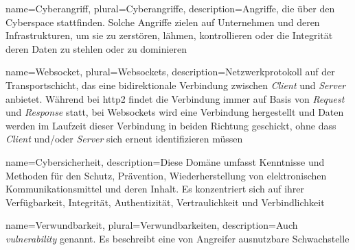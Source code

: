 


 {
    name={Cyberangriff},
    plural={Cyberangriffe},
    description={Angriffe, die über den Cyberspace stattfinden. Solche Angriffe zielen auf Unternehmen und deren Infrastrukturen, um sie zu zerstören, lähmen, kontrollieren oder die Integrität deren Daten zu stehlen oder zu dominieren \citep{NIST_Definitionen}}
}

 {
    name={Websocket},
    plural={Websockets},
    description={Netzwerkprotokoll auf der Transportschicht, das eine bidirektionale Verbindung zwischen \textit{Client} und \textit{Server} anbietet. Während bei \gls{http2} findet die Verbindung immer auf Basis von \textit{Request} und \textit{Response} statt, bei Websockets wird eine Verbindung hergestellt und Daten werden im Laufzeit dieser Verbindung in beiden Richtung geschickt, ohne dass \textit{Client} und/oder \textit{Server} sich erneut identifizieren müssen \citep{Websockets}}
}

 {
    name={Cybersicherheit},
    description={Diese Domäne umfasst Kenntnisse und Methoden für den Schutz, Prävention, Wiederherstellung von elektronischen Kommunikationsmittel und deren Inhalt. Es konzentriert sich auf ihrer Verfügbarkeit, Integrität, Authentizität, Vertraulichkeit und Verbindlichkeit \citep{NIST_Definitionen}}
}

 {
    name={Verwundbarkeit},
    plural={Verwundbarkeiten},
    description={Auch \textit{vulnerability} genannt. Es beschreibt eine von Angreifer ausnutzbare Schwachstelle \citep{Wendzel_It-Sicherheit}}
}

